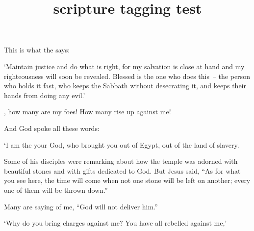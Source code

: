 \documentclass{article}
\title{scripture tagging test}
\begin{document}
\begin{scripture}[Isaiah 56:1--2][version=NIVUK]
This is what the  says:
\begin{poetry}
`Maintain justice
and do what is right,
for my salvation is close at hand
and my righteousness will soon be revealed.
Blessed is the one who does this~--
the person who holds it fast,
who keeps the Sabbath without desecrating it,
and keeps their hands from doing any evil.'
\end{poetry}
\end{scripture}

\begin{scripture}[][chapter/para,
chapter/format=PSALM~#1]
\begin{poetry}
, how many are my foes!
How many rise up against me!
\end{poetry}
\end{scripture}

\begin{scripture}[Exodus 20:1--2]
And God spoke all these words:
\begin{hanging}
\noindent{}`I am the 
your God, who brought you out of Egypt,
out of the land of slavery.
\end{hanging}
\end{scripture}

\begin{scripture}[Luke 21:5–6]
Some of his disciples were remarking
about how the temple was adorned with beautiful
stones and with gifts dedicated to God. But
Jesus said, ``As for what you see here,
the time will come when not one stone will be
left on another; every one of them will be
thrown down.''
\end{scripture}

\begin{scripture}[Psalm 3:2][version=NIV84]
\begin{poetry}
Many are saying of me,
``God will not deliver him.''\selah
\end{poetry}
\end{scripture}

\begin{scripture}[Jeremiah 2:29]
\begin{poetry}
`Why do you bring charges against me?
You have all rebelled against me,'
\end{poetry}
\end{scripture}
\end{document}

